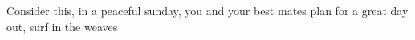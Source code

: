 Consider this, in a peaceful sunday, you and your best mates plan for a great day out, surf in the weaves  